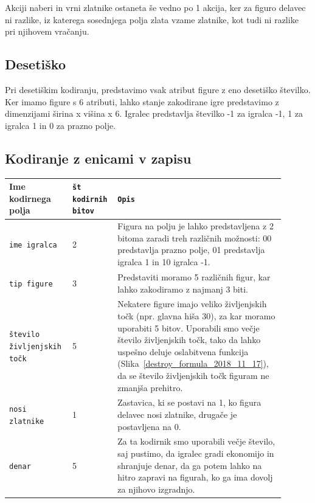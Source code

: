 \documentclass[a4paper, 12pt]{book}
\begin{document}
{Akciji naberi in vrni zlatnike ostaneta še vedno po 1 akcija, ker za figuro delavec ni razlike, iz katerega sosednjega polja zlata vzame zlatnike, kot tudi ni razlike pri njihovem vračanju.

\subsection{Desetiško}
Pri desetiškim kodiranju, predstavimo vsak atribut figure z eno desetiško številko.
Ker imamo figure s 6 atributi, lahko stanje zakodirane igre predstavimo z dimenzijami širina x višina x 6.
Igralec predstavlja številko -1 za igralca -1, 1 za igralca 1 in 0 za prazno polje.

\subsection{Kodiranje z enicami v zapisu}
\label{oneHotEncoder}
\begin{table}
	\begin{center}
		\begin{tabular}{p{0.19\linewidth}|p{0.13\linewidth}|p{0.58\linewidth}}
			Ime kodirnega polja                        & {\tt št kodirnih bitov} & {\tt Opis} \\ \hline
			{\tt ime igralca}                          & 2                       & Figura na polju je lahko predstavljena z 2 bitoma zaradi treh različnih možnosti: 00 predstavlja prazno polje, 01 predstavlja igralca 1 in 10 igralca -1.\\
			{\tt tip figure}                           & 3                       & Predstaviti moramo 5 različnih figur, kar lahko zakodiramo z najmanj 3 biti.\\
			{\tt število življenjskih točk}            & 5                       & Nekatere figure imajo veliko življenjskih točk (npr. glavna hiša 30), za kar moramo uporabiti 5 bitov. 
																                   Uporabili smo večje število življenjskih točk, tako da lahko uspešno deluje oslabitvena funkcija (Slika~\ref{destroy_formula_2018_11_17}), da se število življenjskih točk figuram ne zmanjša prehitro.\\
			{\tt nosi zlatnike}                        & 1                       & Zastavica, ki se postavi na 1, ko figura delavec nosi zlatnike, drugače je postavljena na 0.\\
			{\tt denar}                                & 5                       & Za ta kodirnik smo uporabili večje število, saj pustimo, da igralec gradi ekonomijo in shranjuje denar, da ga potem lahko na hitro zapravi na figurah, ko ga ima dovolj za njihovo izgradnjo.

\end{tabular}
\end{center}
\end{table}}
\end{document}
